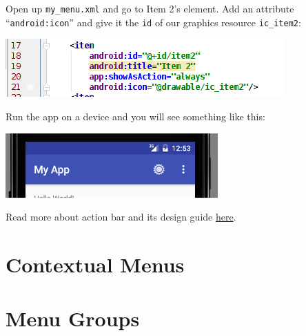 Open up \texttt{my\_menu.xml} and go to Item 2's element. Add an attribute ``\texttt{android:icon}'' and give it the \texttt{id} of our graphics resource \texttt{ic\_item2}:

\begin{center}
	\includegraphics[scale=0.4]{chapters/ch07/images/56}
\end{center}

Run the app on a device and you will see something like this:

\begin{center}
	\includegraphics[scale=0.4]{chapters/ch07/images/57}
\end{center}

Read more about action bar and its design guide \href{https://developer.android.com/design/patterns/actionbar.html}{here}.

\section{Contextual Menus}

\section{Menu Groups}